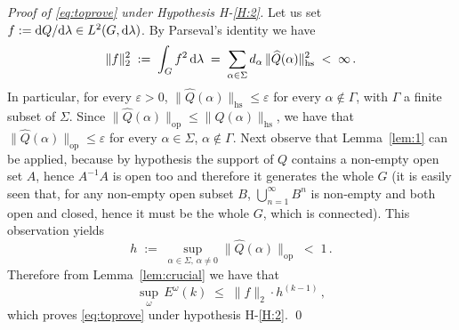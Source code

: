 \documentclass[a4paper,reqno,11pt]{amsart}
\numberwithin{equation}{section}
\newcommand{\ga}{\alpha}
\newcommand{\gep}{\varepsilon}       %
\newcommand{\gl}{\lambda}
\newcommand{\go}{\omega}
\newcommand{\dd}{\text{\rm d}}             %
\DeclareMathOperator*{\union}{\bigcup}       %
\newcommand{\somb}{\widehat} %
\begin{document}
\noindent
{\it Proof of \eqref{eq:toprove} under
Hypothesis H-\ref{H:2}.} 
Let us set $f := \dd Q/\dd \gl \in L^2(G, \dd\gl)$.
By Parseval's identity we have
\begin{equation}
\| f \|^2_2 \;:=\; \int_G f^2 \, \dd \gl \;=\; \sum_{\ga \in \Sigma} d_\ga \,
\|\somb Q(\alpha) \|_{\text{hs}}^{2} \;<\; \infty \,.
\end{equation}
In particular, for every $\gep > 0$, 
$\|\somb Q(\alpha) \|_{\text{hs}} \le \gep$ for every $\ga \notin  \Gamma$,
with $\Gamma$ a finite subset of $\Sigma$.
 Since 
$\|\somb Q(\alpha) \|_{\text{op}} \le \|\somb Q(\alpha) \|_{\text{hs}}$, 
we have that $\|\somb Q(\alpha) \|_{\text{op}} \le \gep$ for every
$\ga \in \Sigma$, $\ga \not \in \Gamma$.
Next observe that Lemma~\ref{lem:1} can be applied, because
by hypothesis the support of $Q$ contains a non-empty open set $A$, hence
$A^{-1}A$ is open too and therefore it generates the whole $G$
(it is easily seen that, for any non-empty open subset $B$,
$\union_{n=1}^\infty B^n$ is non-empty and both open and closed, 
hence it must be the whole $G$, which is connected).
This observation yields
\begin{equation}
\label{eq:h}
	h \;:=\; \sup_{\ga \in \Sigma, \, \ga \ne 0} \|\somb Q(\alpha) \|_{\text{op}}
	\;<\; 1\,.
\end{equation}
Therefore from Lemma~\ref{lem:crucial} we have that
\begin{equation}
	\sup_\go \, E^\go(k) \;\le\; \|f\|_2 \cdot h^{(k-1)}\,,
\end{equation}
which proves \eqref{eq:toprove} under hypothesis H-\ref{H:2}.
\qed

\smallskip
\end{document}
